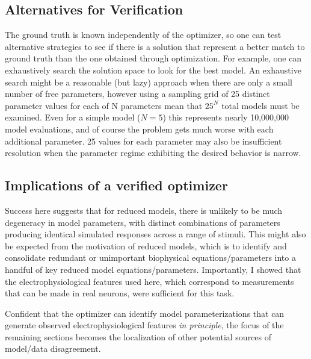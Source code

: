 \subsection{Alternatives for Verification}
The ground truth is known independently of the optimizer, so one can test alternative strategies to see if there is a solution that represent a better match to ground truth than the one obtained through optimization.
For example, one can exhaustively search the solution space to look for the best model.
An exhaustive search might be a reasonable (but lazy) approach when there are only a small number of free parameters, however using a sampling grid of 25 distinct parameter values for each of N parameters mean that $25^{N}$ total models must be examined.
Even for a simple model ($N=5$) this represents nearly 10,000,000 model evaluations, and of course the problem gets much worse with each additional parameter.
25 values for each parameter may also be insufficient resolution when the parameter regime exhibiting the desired behavior is narrow.

\subsection{Implications of a verified optimizer}
Success here suggests that for reduced models, there is unlikely to be much degeneracy in model parameters, with distinct combinations of parameters producing identical simulated responses across a range of stimuli.
This might also be expected from the motivation of reduced models, which is to identify and consolidate redundant or unimportant biophysical equations/parameters into a handful of key reduced model equations/parameters.
Importantly, I showed that the electrophysiological features used here, which correspond to measurements that can be made in real neurons, were sufficient for this task.

Confident that the optimizer can identify model parameterizations that can generate observed electrophysiological features \emph{in principle}, the focus of the remaining sections becomes the localization of other potential sources of model/data disagreement. 
